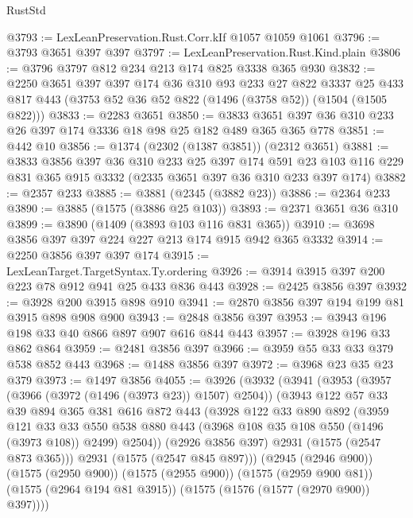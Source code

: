 \begin{lexlean}{RustStd}
\begin{coremodule}
{\begin{coremodule}
{{{{{{{{{{@3793 := LexLeanPreservation.Rust.Corr.kIf @1057 @1059 @1061
@3796 := @3793 @3651 @397 @397
@3797 := LexLeanPreservation.Rust.Kind.plain
@3806 := @3796 @3797 @812 @234 @213 @174 @825 @3338 @365 @930
@3832 := @2250
    @3651
    @397
    @397
    @174
    @36
    @310
    @93
    @233
    @27
    @822
    @3337
    @25
    @433
    @817
    @443
    (@3753 @52 @36 @52 @822 (@1496 (@3758 @52)) (@1504 (@1505 @822)))
@3833 := @2283 @3651
@3850 := @3833 @3651 @397 @36 @310 @233 @26 @397 @174 @3336 @18 @98 @25 @182 @489 @365 @365 @778
@3851 := @442 @10
@3856 := @1374 (@2302 (@1387 @3851)) (@2312 @3651)
@3881 := @3833
    @3856
    @397
    @36
    @310
    @233
    @25
    @397
    @174
    @591
    @23
    @103
    @116
    @229
    @831
    @365
    @915
    @3332
    (@2335 @3651 @397 @36 @310 @233 @397 @174)
@3882 := @2357 @233
@3885 := @3881 (@2345 (@3882 @23))
@3886 := @2364 @233
@3890 := @3885 (@1575 (@3886 @25 @103))
@3893 := @2371 @3651 @36 @310
@3899 := @3890 (@1409 (@3893 @103 @116 @831 @365))
@3910 := @3698 @3856 @397 @397 @224 @227 @213 @174 @915 @942 @365 @3332
@3914 := @2250 @3856 @397 @397 @174
@3915 := LexLeanTarget.TargetSyntax.Ty.ordering
@3926 := @3914 @3915 @397 @200 @223 @78 @912 @941 @25 @433 @836 @443
@3928 := @2425 @3856 @397
@3932 := @3928 @200 @3915 @898 @910
@3941 := @2870 @3856 @397 @194 @199 @81 @3915 @898 @908 @900
@3943 := @2848 @3856 @397
@3953 := @3943 @196 @198 @33 @40 @866 @897 @907 @616 @844 @443
@3957 := @3928 @196 @33 @862 @864
@3959 := @2481 @3856 @397
@3966 := @3959 @55 @33 @33 @379 @538 @852 @443
@3968 := @1488 @3856 @397
@3972 := @3968 @23 @35 @23 @379
@3973 := @1497 @3856
@4055 := @3926
    (@3932
      (@3941
        (@3953
          (@3957 (@3966 (@3972 (@1496 (@3973 @23)) @1507) @2504))
          (@3943
            @122
            @57
            @33
            @39
            @894
            @365
            @381
            @616
            @872
            @443
            (@3928
              @122
              @33
              @890
              @892
              (@3959
                @121
                @33
                @33
                @550
                @538
                @880
                @443
                (@3968 @108 @35 @108 @550 (@1496 (@3973 @108)) @2499)
                @2504))
            (@2926 @3856 @397)
            @2931
            (@1575 (@2547 @873 @365)))
          @2931
          (@1575 (@2547 @845 @897)))
        (@2945 (@2946 @900))
        (@1575 (@2950 @900))
        (@1575 (@2955 @900))
        (@1575 (@2959 @900 @81))
        (@1575 (@2964 @194 @81 @3915))
        (@1575 (@1576 (@1577 (@2970 @900)) @397))))
}}}}}}}}}}
\end{coremodule}}
\end{coremodule}
\end{lexlean}
